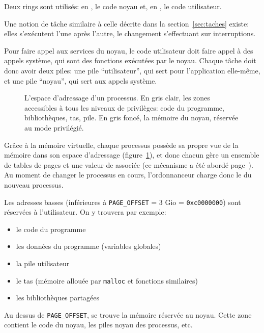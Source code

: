Deux rings sont utilisés: en , le code noyau et, en , le code
utilisateur.

Une notion de tâche similaire à celle décrite dans la section~\ref{sec:taches}
existe: elles s'exécutent l'une après l'autre, le changement s'effectuant sur
interruptions.

Pour faire appel aux services du noyau, le code utilisateur doit faire appel à
des appels système, qui sont des fonctions exécutées par le noyau. Chaque tâche
doit donc avoir deux piles: une pile \enquote{utilisateur}, qui sert pour
l'application elle-même, et une pile \enquote{noyau}, qui sert aux appels
système.

\begin{figure} %
\centering


\caption[Espace d'adressage d'un processus]{L'espace d'adressage d'un processus.
En gris clair, les zones accessibles à tous les niveaux de privilèges: code du
programme, bibliothèques, tas, pile. En gris foncé, la mémoire du noyau,
réservée au mode privilégié.}

\label{fig:memmap}
\end{figure}

Grâce à la mémoire virtuelle, chaque processus possède sa propre vue de la
mémoire dans son espace d'adressage (figure~\ref{fig:memmap}), et donc chacun
gère un ensemble de tables de pages et une valeur de \crtrois{} associée (ce
mécanisme a été abordé page~\pageref{page:mem-virt}). Au moment de changer le
processus en cours, l'ordonnanceur charge donc le \crtrois{} du nouveau
processus.

Les adresses basses (inférieures à \texttt{PAGE\_OFFSET} = 3 Gio =
\texttt{0xc0000000}) sont réservées à l'utilisateur. On y trouvera par exemple:

\begin{itemize}
\item le code du programme
\item les données du programme (variables globales)
\item la pile utilisateur
\item le tas (mémoire allouée par \texttt{malloc} et fonctions similaires)
\item les bibliothèques partagées
\end{itemize}

Au dessus de \texttt{PAGE\_OFFSET}, se trouve la mémoire réservée au noyau.
Cette zone contient le code du noyau, les piles noyau des processus, etc.

